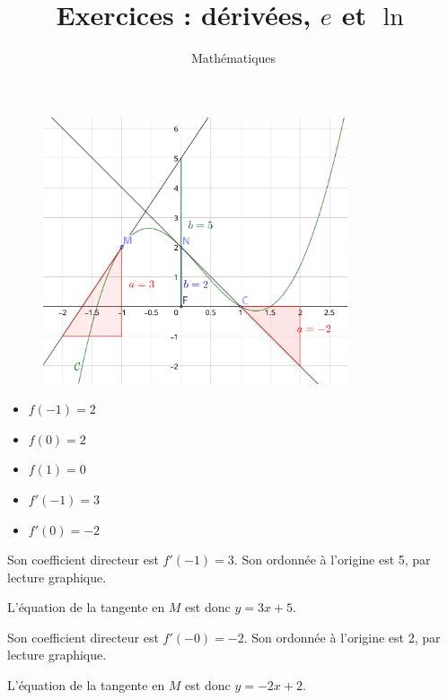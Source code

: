 \documentclass[a4paper,12pt]{scrartcl}
\date{}
\title{Exercices : dérivées, $e$ et $\ln$}
\author{Mathématiques}
\begin{document}
\maketitle


\exo{}

\begin{figure}[h]
\begin{center}
\includegraphics[width=0.8\textwidth]{pics/tangentes.png}
\end{center}
\end{figure}

\question{} 
\begin{itemize}
\item $f(-1)  = 2$
\item $f(0)   = 2$
\item $f(1)   = 0$
\item $f'(-1) = 3$
\item $f'(0)  = -2$
\end{itemize}


Son coefficient directeur est $f'(-1) = 3$. Son ordonnée à l'origine est 5, par lecture graphique.

L'équation de la tangente en $M$ est donc $y = 3x+5$.


Son coefficient directeur est $f'(-0) = -2$. Son ordonnée à l'origine est 2, par lecture graphique.

L'équation de la tangente en $M$ est donc $y = -2x+2$.


\end{document}
